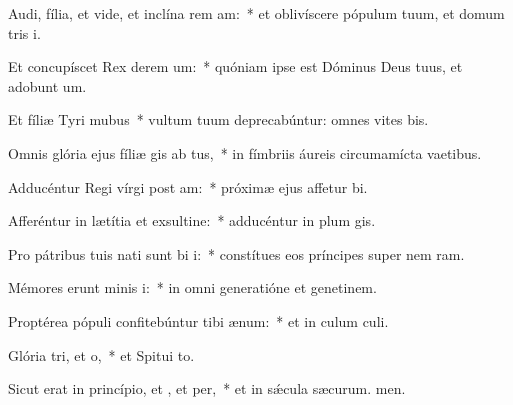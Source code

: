 \item Audi, fília, et vide, et inclína rem am:~* et oblivíscere pópulum tuum, et domum tris i.
\item Et concupíscet Rex derem um:~* quóniam ipse est Dóminus Deus tuus, et adobunt um.
\item Et fíliæ Tyri  mubus~* vultum tuum deprecabúntur: omnes vites bis.
\item Omnis glória ejus fíliæ gis ab tus,~* in fímbriis áureis circumamícta vaetibus.
\item Adducéntur Regi vírgi post am:~* próximæ ejus affetur bi.
\item Afferéntur in lætítia et exsultine:~* adducéntur in plum gis.
\item Pro pátribus tuis nati sunt bi i:~* constítues eos príncipes super nem ram.
\item Mémores erunt minis i:~* in omni generatióne et genetinem.
\item Proptérea pópuli confitebúntur tibi  ænum:~* et in culum culi.
\item Glória tri, et o,~* et Spitui to.
\item Sicut erat in princípio, et , et per,~* et in sǽcula sæcurum. men.
